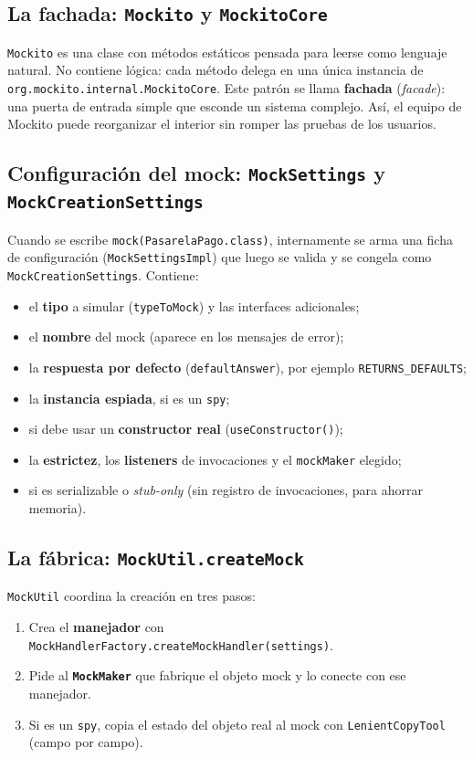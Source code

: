 \documentclass[11pt,a4paper,oneside]{report}
\newcommand{\code}[1]{\texttt{#1}}
\begin{document}
\subsection{La fachada: \code{Mockito} y \code{MockitoCore}}
\code{Mockito} es una clase con métodos estáticos pensada para leerse como lenguaje natural. No contiene lógica: cada método delega en una única instancia de \code{org.mockito.internal.MockitoCore}. Este patrón se llama \textbf{fachada} (\emph{facade}): una puerta de entrada simple que esconde un sistema complejo. Así, el equipo de Mockito puede reorganizar el interior sin romper las pruebas de los usuarios.

\subsection{Configuración del mock: \code{MockSettings} y \code{MockCreationSettings}}
Cuando se escribe \code{mock(PasarelaPago.class)}, internamente se arma una ficha de configuración (\code{MockSettingsImpl}) que luego se valida y se congela como \code{MockCreationSettings}. Contiene:
\begin{itemize}
  \item el \textbf{tipo} a simular (\code{typeToMock}) y las interfaces adicionales;
  \item el \textbf{nombre} del mock (aparece en los mensajes de error);
  \item la \textbf{respuesta por defecto} (\code{defaultAnswer}), por ejemplo \code{RETURNS\_DEFAULTS};
  \item la \textbf{instancia espiada}, si es un \code{spy};
  \item si debe usar un \textbf{constructor real} (\code{useConstructor()});
  \item la \textbf{estrictez}, los \textbf{listeners} de invocaciones y el \code{mockMaker} elegido;
  \item si es serializable o \emph{stub-only} (sin registro de invocaciones, para ahorrar memoria).
\end{itemize}

\subsection{La fábrica: \code{MockUtil.createMock}}
\code{MockUtil} coordina la creación en tres pasos:
\begin{enumerate}
  \item Crea el \textbf{manejador} con \code{MockHandlerFactory.createMockHandler(settings)}.
  \item Pide al \textbf{\code{MockMaker}} que fabrique el objeto mock y lo conecte con ese manejador.
  \item Si es un \code{spy}, copia el estado del objeto real al mock con \code{LenientCopyTool} (campo por campo).
\end{enumerate}
\end{document}
